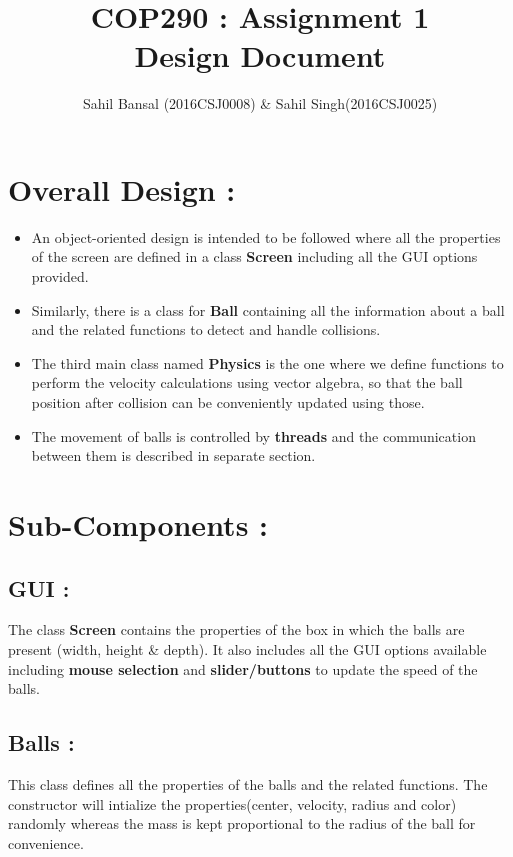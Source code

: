 \documentclass[]{article}
\title{\textbf{COP290 : Assignment 1 \\ Design Document}}
\author{Sahil Bansal (2016CSJ0008) \& Sahil Singh(2016CSJ0025)}
\begin{document}
\maketitle

\section{\LARGE Overall Design :}
\Large
\begin{itemize}
	\item  An object-oriented design is intended to be followed where all the properties of the screen are defined in a class \textbf{Screen} including all the GUI options provided.
	\item Similarly, there is a class for \textbf{Ball} containing all the information about a ball and the related functions to detect and handle collisions.
	\item The third main class named \textbf{Physics} is the one where we define functions to perform the velocity calculations using vector algebra, so that the ball position after collision can be conveniently updated using those.
	\item The movement of balls is controlled by \textbf{threads} and the communication between them is described in separate section.
\end{itemize}  

\section{\LARGE Sub-Components :}

\subsection{GUI :}
\Large The class \textbf{Screen} contains the properties of the box in which the balls are present (width, height \& depth). It also includes all the GUI options available including \textbf{mouse selection} and \textbf{slider/buttons} to update the speed of the balls.

\subsection{Balls :}
\Large This class defines all the properties of the balls and the related functions. The constructor will intialize the properties(center, velocity, radius and color) randomly whereas the mass is kept proportional to the radius of the ball for convenience. 
\end{document}
